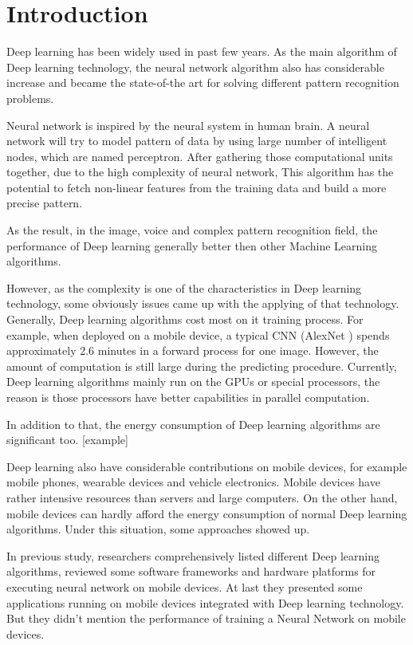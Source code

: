 \documentclass[article]{aaltoseries}
\begin{document}


\section{Introduction}


Deep learning has been widely used in past few years. As the main algorithm of Deep learning technology,
 the neural network algorithm 
also has considerable increase and became the state-of-the art for solving different pattern recognition
problems.

Neural network is inspired by the neural system in human brain. A neural network will 
try to model pattern of data by using large number of intelligent nodes, which are named perceptron. 
After gathering those computational units together, due to the high complexity of neural network, 
This algorithm has the potential to fetch non-linear features from the training data 
and build a more precise pattern.

As the result, in the image, voice and complex pattern recognition field, the performance of Deep learning
generally better then other Machine Learning algorithms.  

However, as the complexity is one of the characteristics in Deep learning technology, some obviously
issues came up with the applying of that technology. Generally, Deep learning algorithms cost most 
on it training process. For example, when deployed on a mobile device, a typical CNN (AlexNet \cite{NIPS2012_4824}) 
spends approximately 2.6 minutes in a forward process for one image. However, the amount of computation is 
still large
during the predicting procedure. Currently, Deep learning algorithms mainly run on the GPUs or special processors, 
the reason is those processors have better capabilities in parallel computation.

In addition to that, the energy consumption of Deep learning algorithms are significant too. [example]

Deep learning also have considerable contributions on mobile devices, for example mobile phones, 
wearable devices and vehicle electronics. Mobile devices have rather intensive resources than 
servers and large computers. On the other hand, mobile devices can hardly afford the energy consumption
of normal Deep learning algorithms. Under this situation, some approaches showed up.

In previous study\cite{Ota:2017}, researchers comprehensively listed different Deep learning algorithms,
reviewed some software frameworks and hardware platforms for executing neural network on mobile devices.
At last they presented some applications running on mobile devices integrated with Deep learning technology. 
But they didn't mention the performance of training a Neural Network on mobile devices. 
\end{document}
